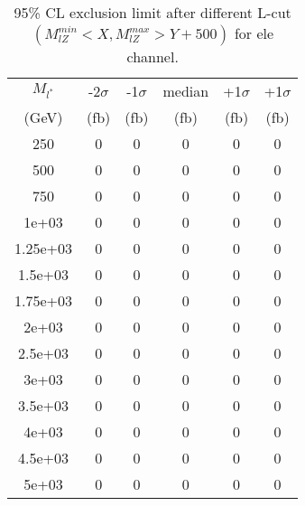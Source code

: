 \documentclass[]{article}
\begin{document}
\begin{table}
\begin{center}
\begin{tabular}{cccccc}
\hline 
\hline 
$M_{l^*}$ & -2$\sigma$ & -1$\sigma$ & median & +1$\sigma$ & +1$\sigma$\\ 
(GeV) & (fb) & (fb) & (fb) & (fb) & (fb)  \\ 
\hline 
\hline 
250 & 0 & 0 & 0 & 0 & 0\\
500 & 0 & 0 & 0 & 0 & 0\\
750 & 0 & 0 & 0 & 0 & 0\\
1e+03 & 0 & 0 & 0 & 0 & 0\\
1.25e+03 & 0 & 0 & 0 & 0 & 0\\
1.5e+03 & 0 & 0 & 0 & 0 & 0\\
1.75e+03 & 0 & 0 & 0 & 0 & 0\\
2e+03 & 0 & 0 & 0 & 0 & 0\\
2.5e+03 & 0 & 0 & 0 & 0 & 0\\
3e+03 & 0 & 0 & 0 & 0 & 0\\
3.5e+03 & 0 & 0 & 0 & 0 & 0\\
4e+03 & 0 & 0 & 0 & 0 & 0\\
4.5e+03 & 0 & 0 & 0 & 0 & 0\\
5e+03 & 0 & 0 & 0 & 0 & 0\\
\hline 
\end{tabular}
\caption{95\% CL exclusion limit after different L-cut $(M_{lZ}^{min} < X, M_{lZ}^{max} > Y + 500)$ for ele channel.}
\label{tab:limit_electron}
\end{center}
\end{table}
\end{document}
